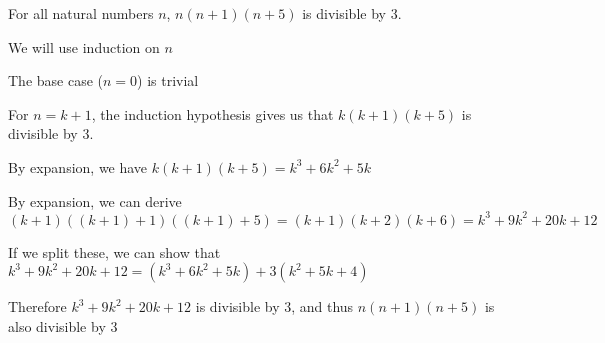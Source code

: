 
For all natural numbers $n$, $n(n+1)(n+5)$ is divisible by $3$.

We will use induction on $n$

The base case ($n=0$) is trivial

For $n=k+1$, the induction hypothesis gives us that $k(k+1)(k+5)$ is divisible by $3$.

By expansion, we have $k(k+1)(k+5) = k^3 + 6k^2 + 5k$

By expansion, we can derive $(k+1)((k+1)+1)((k+1)+5) = (k+1)(k+2)(k+6) = k^3 + 9k^2 + 20k + 12$

If we split these, we can show that $k^3 + 9k^2 + 20k + 12 = (k^3 + 6k^2 + 5k) + 3(k^2 + 5k + 4)$

Therefore $k^3 + 9k^2 + 20k + 12$ is divisible by $3$, and thus $n(n+1)(n+5)$ is also divisible by $3$

